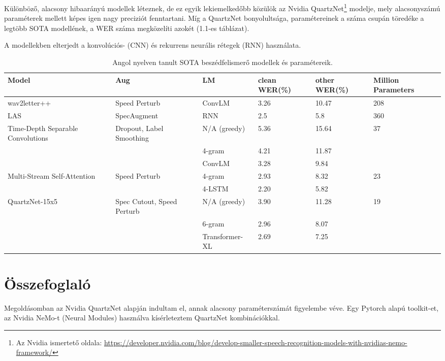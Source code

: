 Különböző, alacsony hibaarányú modellek léteznek, de ez egyik lekiemelkedőbb közülök az Nvidia QuartzNet\footnote{Az Nvidia ismertető oldala: \url{https://developer.nvidia.com/blog/develop-smaller-speech-recognition-models-with-nvidias-nemo-framework/}} modelje, mely alacsonyszámú paraméterek mellett képes igen nagy preciziót fenntartani. Míg a QuartzNet bonyolultsága, paramétereinek a száma csupán töredéke a legtöbb SOTA modellének, a WER száma megközelíti azokét (1.1-es táblázat).

A modellekben elterjedt a konvolúciós- (CNN) és rekurrens neurális rétegek  (RNN) használata.

\begin{table}[ht]
	\footnotesize
	\centering
	\begin{tabular}{ p{2cm} p{2cm} p{2.5cm} p{1.5cm} p{1.5cm} p{2cm} }
		\toprule
		\textbf{Model} & \textbf{Aug} & \textbf{LM} & \textbf{clean WER(\%)} & \textbf{other WER(\%)} & \textbf{Million Parameters} \\
		\midrule
		wav2letter++ & Speed Perturb & ConvLM & 3.26 & 10.47 & 208 \\
		\hline
		LAS & SpecAugment & RNN & 2.5 & 5.8 & 360 \\
		\hline
		Time-Depth Separable Convolutions & Dropout, Label Smoothing & N/A (greedy) & 5.36 & 15.64 & 37 \\
		&  & 4-gram & 4.21 & 11.87 &  \\
		&  & ConvLM & 3.28 & 9.84 &  \\
		\hline
		Multi-Stream Self-Attention & Speed Perturb & 4-gram & 2.93 & 8.32 & 23  \\
		&  & 4-LSTM & 2.20 & 5.82 &  \\
		\hline
		QuartzNet-15x5 & Spec Cutout, Speed Perturb & N/A (greedy) & 3.90 & 11.28 & 19 \\
		&  & 6-gram & 2.96 & 8.07 &  \\
		&  & Transformer-XL & 2.69 & 7.25 &  \\
		\bottomrule
	\end{tabular}
	\caption{Angol nyelven tanult SOTA beszédfelismerő modellek és paramétereik.}
\end{table}

\section{Összefoglaló}

Megoldásomban az Nvidia QuartzNet alapján indultam el, annak alacsony paraméterszámát figyelembe véve. Egy Pytorch alapú toolkit-et, az Nvidia NeMo-t (Neural Modules) használva kísérleteztem QuartzNet kombinációkkal.

